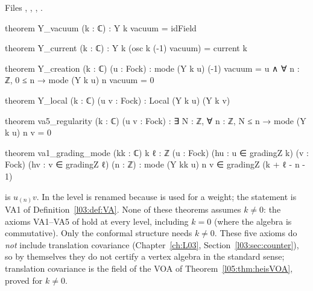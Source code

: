 \noindent Files ,
, ,
.
\begin{leancode}
theorem Y_vacuum (k : ℂ) : Y k vacuum = idField

theorem Y_current (k : ℂ) : Y k (osc k (-1) vacuum) = current k

theorem Y_creation (k : ℂ) (u : Fock) :
    mode (Y k u) (-1) vacuum = u ∧ ∀ n : ℤ, 0 ≤ n → mode (Y k u) n vacuum = 0

theorem Y_local (k : ℂ) (u v : Fock) : Local (Y k u) (Y k v)

theorem va5_regularity (k : ℂ) (u v : Fock) :
    ∃ N : ℤ, ∀ n : ℤ, N ≤ n → mode (Y k u) n v = 0

theorem va1_grading_mode (kk : ℂ) {k ℓ : ℤ} (u : Fock) (hu : u ∈ gradingZ k)
    (v : Fock) (hv : v ∈ gradingZ ℓ) (n : ℤ) :
    mode (Y kk u) n v ∈ gradingZ (k + ℓ - n - 1)
\end{leancode}

\begin{dictionary}
 is $u_{(n)}v$. In  the level is renamed  because
 is used for a weight; the statement is VA1 of Definition~\ref{l03:def:VA}. None of these
theorems assumes $k\ne0$: the axioms VA1--VA5 of  hold at every level, including $k=0$ (where the
algebra is commutative). Only the conformal structure needs $k\neq0$. These five axioms do \emph{not} include
translation covariance (Chapter~\ref{ch:L03}, Section~\ref{l03:sec:counter}), so by themselves they do not certify a vertex
algebra in the standard sense; translation covariance is the field  of the VOA of
Theorem~\ref{l05:thm:heisVOA}, proved for $k\neq0$.
\end{dictionary}

